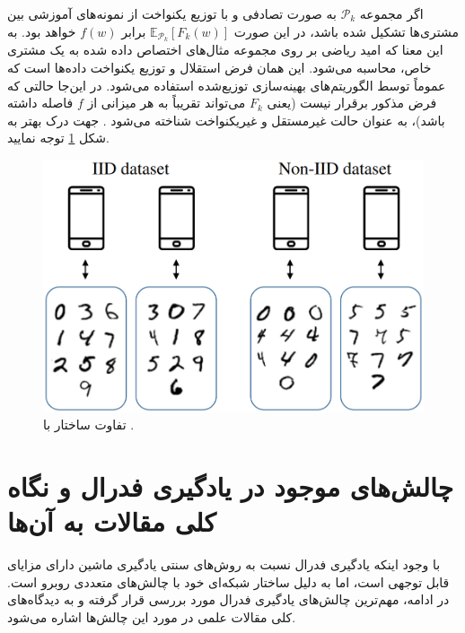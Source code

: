 اگر مجموعه 
$\mathcal{P}_k$ 
به صورت تصادفی و با توزیع یکنواخت%
از نمونه‌های آموزشی بین مشتری‌ها تشکیل شده باشد، در این صورت 
$\mathbb{E}_{\mathcal{P}_k}\left[F_k(w)\right]$ 
برابر
$f(w)$ 
خواهد بود. به این معنا که امید ریاضی بر روی مجموعه مثال‌های اختصاص داده شده به یک مشتری خاص، محاسبه می‌شود.
این همان فرض
استقلال و توزیع یکنواخت داده‌ها%
است که عموماً توسط الگوریتم‌های بهینه‌سازی توزیع‌شده استفاده می‌شود. در این‌جا حالتی که فرض مذکور برقرار نیست (یعنی
$F_k$
می‌تواند تقریباً به هر میزانی از
$f$
فاصله داشته باشد)، به عنوان حالت
غیرمستقل و غیریکنواخت
شناخته می‌شود
\cite{mcmahan2017communication}.
جهت درک بهتر به شکل
\ref{iid_vs_noniid}
توجه نمایید.


\begin{figure}[t]
	\centering
	\includegraphics[scale=0.4]{images/chap2/iid_vs_noniid.png}%
	\caption{%
		تفاوت ساختار
		با
		\cite{hellström2022wirelessmachinelearning}.
	}
	\label{iid_vs_noniid}
	\centering
\end{figure}



\section{چالش‌های موجود در یادگیری فدرال و نگاه کلی مقالات به آن‌ها}
با وجود اینکه یادگیری فدرال نسبت به روش‌های سنتی یادگیری ماشین دارای مزایای قابل توجهی است، اما به دلیل ساختار شبکه‌ای خود با چالش‌های متعددی روبرو است. در ادامه، مهم‌ترین چالش‌های یادگیری فدرال مورد بررسی قرار گرفته و به دیدگاه‌های کلی مقالات علمی در مورد این چالش‌ها اشاره می‌شود.


